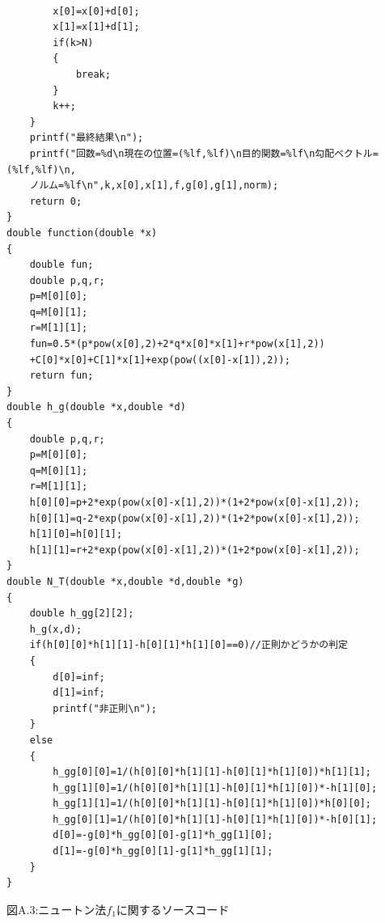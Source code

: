\documentclass[12pt]{jarticle}
\begin{document}
\begin{framed}
\begin{verbatim}
        
        x[0]=x[0]+d[0];
        x[1]=x[1]+d[1];
        if(k>N)
        {
            break;
        }
        k++;
    }
    printf("最終結果\n");
    printf("回数=%d\n現在の位置=(%lf,%lf)\n目的関数=%lf\n勾配ベクトル=(%lf,%lf)\n,
    ノルム=%lf\n",k,x[0],x[1],f,g[0],g[1],norm);
    return 0;
}
double function(double *x)
{
    double fun;
    double p,q,r;
    p=M[0][0];
    q=M[0][1];
    r=M[1][1];
    fun=0.5*(p*pow(x[0],2)+2*q*x[0]*x[1]+r*pow(x[1],2))
    +C[0]*x[0]+C[1]*x[1]+exp(pow((x[0]-x[1]),2));
    return fun;
}
double h_g(double *x,double *d)
{
    double p,q,r;
    p=M[0][0];
    q=M[0][1];
    r=M[1][1];
    h[0][0]=p+2*exp(pow(x[0]-x[1],2))*(1+2*pow(x[0]-x[1],2));
    h[0][1]=q-2*exp(pow(x[0]-x[1],2))*(1+2*pow(x[0]-x[1],2));
    h[1][0]=h[0][1];
    h[1][1]=r+2*exp(pow(x[0]-x[1],2))*(1+2*pow(x[0]-x[1],2));
}
double N_T(double *x,double *d,double *g)
{
    double h_gg[2][2];
    h_g(x,d);
    if(h[0][0]*h[1][1]-h[0][1]*h[1][0]==0)//正則かどうかの判定
    {
        d[0]=inf;
        d[1]=inf;
        printf("非正則\n");
    }
    else
    {
        h_gg[0][0]=1/(h[0][0]*h[1][1]-h[0][1]*h[1][0])*h[1][1];
        h_gg[1][0]=1/(h[0][0]*h[1][1]-h[0][1]*h[1][0])*-h[1][0];
        h_gg[1][1]=1/(h[0][0]*h[1][1]-h[0][1]*h[1][0])*h[0][0];
        h_gg[0][1]=1/(h[0][0]*h[1][1]-h[0][1]*h[1][0])*-h[0][1];
        d[0]=-g[0]*h_gg[0][0]-g[1]*h_gg[1][0];
        d[1]=-g[0]*h_gg[0][1]-g[1]*h_gg[1][1];
    }
} 
    \end{verbatim}
\end{framed}
\begin{center}
    図A.3:ニュートン法$f_1$に関するソースコード
\end{center}
\end{document}
